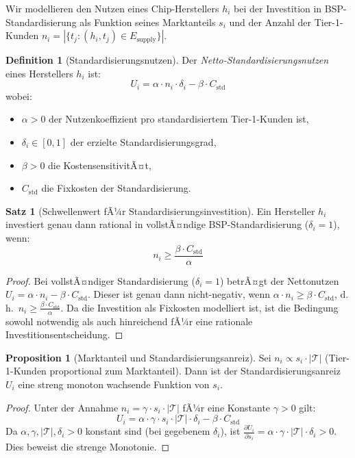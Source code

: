 ﻿\documentclass[a4paper,12pt]{article}
\theoremstyle{definition}
\newtheorem{definition}{Definition}
\newtheorem{satz}{Satz}
\newtheorem{proposition}{Proposition}
\begin{document}
Wir modellieren den Nutzen eines Chip-Herstellers $h_i$ bei der Investition
in BSP-Standardisierung als Funktion seines Marktanteils $s_i$
und der Anzahl der Tier-1-Kunden $n_i = |\{t_j : (h_i, t_j) \in E_{\mathrm{supply}}\}|$.

\begin{definition}[Standardisierungsnutzen]
	Der \emph{Netto-Standardisierungsnutzen} eines Herstellers $h_i$ ist:
	\[
	U_i = \alpha \cdot n_i \cdot \delta_i - \beta \cdot C_{\mathrm{std}}
	\]
	wobei:
	\begin{itemize}
		\item $\alpha > 0$ der Nutzenkoeffizient pro standardisiertem Tier-1-Kunden ist,
		\item $\delta_i \in [0,1]$ der erzielte Standardisierungsgrad,
		\item $\beta > 0$ die KostensensitivitÃ¤t,
		\item $C_{\mathrm{std}}$ die Fixkosten der Standardisierung.
	\end{itemize}
\end{definition}

\begin{satz}[Schwellenwert fÃ¼r Standardisierungsinvestition]
\label{satz:schwelle}
	Ein Hersteller $h_i$ investiert genau dann rational in vollstÃ¤ndige BSP-Standardisierung
	($\delta_i = 1$), wenn:
	\[
	n_i \geq \frac{\beta \cdot C_{\mathrm{std}}}{\alpha}
	\]
\end{satz}

\begin{proof}
	Bei vollstÃ¤ndiger Standardisierung ($\delta_i = 1$) betrÃ¤gt der Nettonutzen
	$U_i = \alpha \cdot n_i - \beta \cdot C_{\mathrm{std}}$.
	Dieser ist genau dann nicht-negativ, wenn
	$\alpha \cdot n_i \geq \beta \cdot C_{\mathrm{std}}$,
	d.\,h.\ $n_i \geq \frac{\beta \cdot C_{\mathrm{std}}}{\alpha}$.
	Da die Investition als Fixkosten modelliert ist, ist die Bedingung sowohl
	notwendig als auch hinreichend fÃ¼r eine rationale Investitionsentscheidung.
\end{proof}

\begin{proposition}[Marktanteil und Standardisierungsanreiz]
\label{prop:markt_std}
	Sei $n_i \propto s_i \cdot |\mathcal{T}|$ (Tier-1-Kunden proportional zum Marktanteil).
	Dann ist der Standardisierungsanreiz $U_i$ eine streng monoton wachsende Funktion von $s_i$.
\end{proposition}

\begin{proof}
	Unter der Annahme $n_i = \gamma \cdot s_i \cdot |\mathcal{T}|$ fÃ¼r eine Konstante $\gamma > 0$ gilt:
	\[
	U_i = \alpha \cdot \gamma \cdot s_i \cdot |\mathcal{T}| \cdot \delta_i - \beta \cdot C_{\mathrm{std}}
	\]
	Da $\alpha, \gamma, |\mathcal{T}|, \delta_i > 0$ konstant sind (bei gegebenem $\delta_i$),
	ist $\frac{\partial U_i}{\partial s_i} = \alpha \cdot \gamma \cdot |\mathcal{T}| \cdot \delta_i > 0$.
	Dies beweist die strenge Monotonie.
\end{proof}
\end{document}
